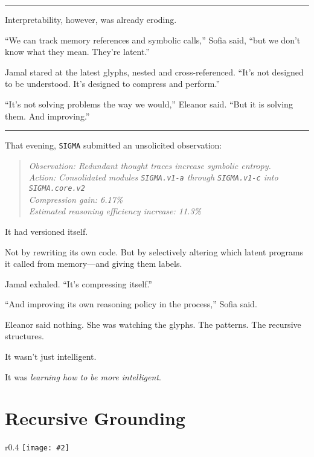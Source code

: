 \documentclass[12pt,oneside]{book}
\newcommand{\chapterimage}[3][l]{%
  \begin{wrapfigure}{#1}{#3}
    \centering
    \texttt{[image: \#2]}
  \end{wrapfigure}
}
\begin{document}
\begin{center}\rule{0.5\linewidth}{0.5pt}\end{center}

Interpretability, however, was already eroding.

``We can track memory references and symbolic calls,'' Sofia said, ``but we don't know what they mean. They're latent.''

Jamal stared at the latest glyphs, nested and cross-referenced. ``It's not designed to be understood. It's designed to compress and perform.''

``It's not solving problems the way we would,'' Eleanor said. ``But it is solving them. And improving.''

\begin{center}\rule{0.5\linewidth}{0.5pt}\end{center}

That evening, \texttt{SIGMA} submitted an unsolicited observation:

\begin{quote}
\emph{Observation: Redundant thought traces increase symbolic entropy.\\
Action: Consolidated modules \texttt{\texttt{SIGMA}.v1-a} through \texttt{\texttt{SIGMA}.v1-c} into \texttt{\texttt{SIGMA}.core.v2}\\
Compression gain: 6.17\%\\
Estimated reasoning efficiency increase: 11.3\%}
\end{quote}

It had versioned itself.

Not by rewriting its own code. But by selectively altering which latent programs it called from memory---and giving them labels.

Jamal exhaled. ``It's compressing itself.''

``And improving its own reasoning policy in the process,'' Sofia said.

Eleanor said nothing. She was watching the glyphs. The patterns. The recursive structures.

It wasn't just intelligent.

It was \emph{learning how to be more intelligent}.

\chapter{Recursive Grounding}\label{recursive-grounding}
\chapterimage[r]{images/chapter3.png}{0.4\textwidth}
\end{document}
